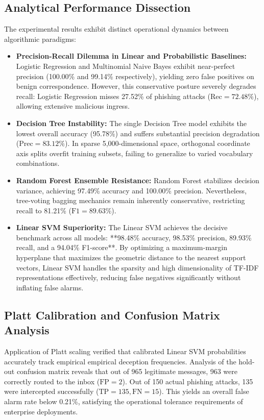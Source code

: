 \documentclass[conference]{IEEEtran}
\begin{document}
\subsection{Analytical Performance Dissection}
The experimental results exhibit distinct operational dynamics between algorithmic paradigms:
\begin{itemize}
    \item \textbf{Precision-Recall Dilemma in Linear and Probabilistic Baselines:} Logistic Regression and Multinomial Naive Bayes exhibit near-perfect precision (100.00\% and 99.14\% respectively), yielding zero false positives on benign correspondence. However, this conservative posture severely degrades recall: Logistic Regression misses 27.52\% of phishing attacks ($\text{Rec} = 72.48\%$), allowing extensive malicious ingress.
    \item \textbf{Decision Tree Instability:} The single Decision Tree model exhibits the lowest overall accuracy (95.78\%) and suffers substantial precision degradation ($\text{Prec} = 83.12\%$). In sparse 5,000-dimensional space, orthogonal coordinate axis splits overfit training subsets, failing to generalize to varied vocabulary combinations.
    \item \textbf{Random Forest Ensemble Resistance:} Random Forest stabilizes decision variance, achieving 97.49\% accuracy and 100.00\% precision. Nevertheless, tree-voting bagging mechanics remain inherently conservative, restricting recall to 81.21\% ($\text{F1} = 89.63\%$).
    \item \textbf{Linear SVM Superiority:} The Linear SVM achieves the decisive benchmark across all models: **98.48\% accuracy, 98.53\% precision, 89.93\% recall, and a 94.04\% F1-score**. By optimizing a maximum-margin hyperplane that maximizes the geometric distance to the nearest support vectors, Linear SVM handles the sparsity and high dimensionality of TF-IDF representations effectively, reducing false negatives significantly without inflating false alarms.
\end{itemize}

\subsection{Platt Calibration and Confusion Matrix Analysis}
Application of Platt scaling verified that calibrated Linear SVM probabilities accurately track empirical empirical deception frequencies. Analysis of the hold-out confusion matrix reveals that out of 965 legitimate messages, 963 were correctly routed to the inbox ($\text{FP} = 2$). Out of 150 actual phishing attacks, 135 were intercepted successfully ($\text{TP} = 135, \text{FN} = 15$). This yields an overall false alarm rate below 0.21\%, satisfying the operational tolerance requirements of enterprise deployments.
\end{document}
